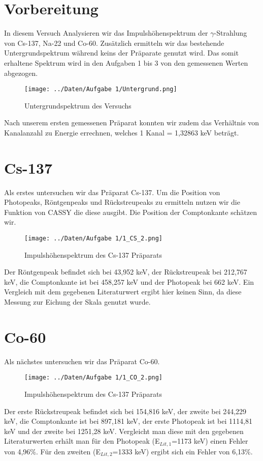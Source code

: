 \section{Vorbereitung}
In diesem Versuch Analysieren wir das Impulshöhenspektrum der $ \gamma $-Strahlung von Cs-137, Na-22 und Co-60. Zusätzlich ermitteln wir das bestehende Untergrundspektrum während keins der Präparate genutzt wird. Das somit erhaltene Spektrum wird in den Aufgaben 1 bis 3 von den gemessenen Werten abgezogen.
\begin{figure}
	\centering
	\texttt{[image: ../Daten/Aufgabe 1/Untergrund.png]}
	\caption{Untergrundspektrum des Versuchs}
\end{figure}
Nach unserem ersten gemessenen Präparat konnten wir zudem das Verhältnis von Kanalanzahl zu Energie errechnen, welches 1 Kanal = 1,32863 keV beträgt.
\section{Cs-137}
Als erstes untersuchen wir das Präparat Cs-137. Um die Position von Photopeaks, Röntgenpeaks und Rückstreupeaks zu ermitteln nutzen wir die Funktion von CASSY die diese ausgibt. Die Position der Comptonkante schätzen wir.
\begin{figure}
	\centering
	\texttt{[image: ../Daten/Aufgabe 1/1\_CS\_2.png]}
	\caption{Impulshöhenspektrum des Cs-137 Präparats}
\end{figure}
Der Röntgenpeak befindet sich bei 43,952 keV, der Rückstreupeak bei 212,767 keV, die Comptonkante ist bei 458,257 keV und der Photopeak bei 662 keV. Ein Vergleich mit dem gegebenen Literaturwert ergibt hier keinen Sinn, da diese Messung zur Eichung der Skala genutzt wurde.
\section{Co-60}
Als nächstes untersuchen wir das Präparat Co-60.
\begin{figure}
	\centering
	\texttt{[image: ../Daten/Aufgabe 1/1\_CO\_2.png]}
	\caption{Impulshöhenspektrum des Cs-137 Präparats}
\end{figure}
Der erste Rückstreupeak befindet sich bei 154,816 keV, der zweite bei 244,229 keV, die Comptonkante ist bei 897,181 keV, der erste Photopeak ist bei 1114,81 keV und der zweite bei 1251,28 keV. Vergleicht man diese mit den gegebenen Literaturwerten erhält man für den Photopeak (E$ _{Lit,1} $=1173 keV) einen Fehler von 4,96\%. Für den zweiten (E$ _{Lit,2} $=1333 keV) ergibt sich ein Fehler von 6,13\%.
